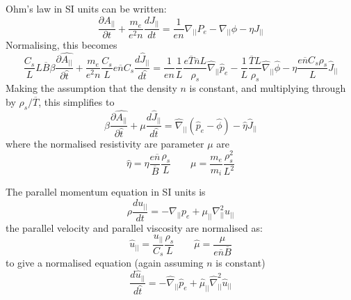 \documentclass[12pt]{article}
\newcommand{\deriv}[2]{\ensuremath{\frac{\partial #1}{\partial #2}}}
\newcommand{\apar}{\ensuremath{A_{||}}}
\begin{document}
Ohm's law in SI units can be written:
\[
\deriv{\apar}{t} + \frac{m_e}{e^2n}\frac{dJ_{||}}{dt} = \frac{1}{en}\nabla_{||}P_e - \nabla_{||}\phi - \eta J_{||}
\]
Normalising, this becomes
\[
\frac{C_s}{L}L\overline{B}\beta\deriv{\hat{\apar}}{\hat{t}} + \frac{m_e}{e^2n}\frac{C_s}{L}e\overline{n}C_s\frac{d\hat{J}_{||}}{d\hat{t}} = \frac{1}{en}\frac{1}{L}\frac{e\overline{T}\overline{n}L}{\rho_s}\hat{\nabla}_{||}\hat{p}_e - \frac{1}{L}\frac{\overline{T}L}{\rho_s}\hat{\nabla}_{||}\hat{\phi} - \eta\frac{e\overline{n}C_s\rho_s}{L}\hat{J}_{||}
\]
Making the assumption that the density $n$ is constant, and multiplying through by $\rho_s/\overline{T}$, this simplifies
to
\[
\beta\deriv{\hat{\apar}}{\hat{t}} + \mu\frac{d\hat{J}_{||}}{d\hat{t}} = \hat{\nabla}_{||}\left(\hat{p}_e - \hat{\phi}\right) - \hat{\eta}\hat{J}_{||}
\]
where the normalised resistivity are parameter $\mu$ are
\[
\boxed{\hat{\eta} = \eta\frac{e\overline{n}}{\overline{B}}\frac{\rho_s}{L}} \qquad \mu = \frac{m_e}{m_i}\frac{\rho_s^2}{L^2}
\]

The parallel momentum equation in SI units is
\[
\rho\frac{du_{||}}{dt} = -\nabla_{||}p_e + \mu_{||}\nabla_{||}^2u_{||}
\]
the parallel velocity and parallel viscosity are normalised as:
\[
\boxed{\hat{u}_{||} = \frac{u_{||}}{C_s}\frac{\rho_s}{L}} \qquad \boxed{\hat{\mu} = \frac{\mu}{e\overline{n}\overline{B}}}
\]
to give a normalised equation (again assuming $n$ is constant)
\[
\frac{d\hat{u}_{||}}{d\hat{t}} = -\hat{\nabla}_{||}\hat{p}_e + \hat{\mu}_{||}\hat{\nabla}_{||}^2\hat{u}_{||}
\]
\end{document}
